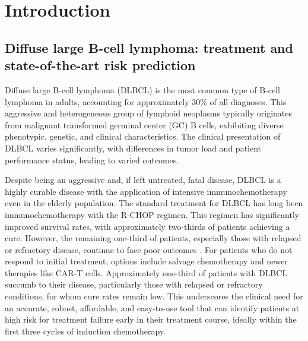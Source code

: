 \chapter{Introduction}

\section{Diffuse large B-cell lymphoma: treatment and state-of-the-art risk prediction}

Diffuse large B-cell lymphoma (DLBCL) is the most common type of B-cell lymphoma in adults, 
accounting for approximately 30\% of all diagnoses. This aggressive and heterogeneous group of 
lymphoid neoplasms typically originates from malignant transformed germinal center (GC) B cells, 
exhibiting diverse phenotypic, genetic, and clinical characteristics. The clinical presentation of 
DLBCL varies significantly, with differences in tumor load and patient performance status, leading 
to varied outcomes.

Despite being an aggressive and, if left untreated, fatal disease, DLBCL is a highly curable disease with the 
application of intensive immunochemotherapy even in the elderly population. The standard treatment 
for DLBCL has long been immunochemotherapy with the R-CHOP regimen. This 
regimen has significantly improved survival rates, with approximately two-thirds of patients 
achieving a cure. However, the remaining one-third of patients, especially 
those with relapsed or refractory disease, continue to face poor outcomes \citep{glass17}. For patients who do not 
respond to initial treatment, options include salvage chemotherapy and newer therapies like CAR-T cells. 
Approximately one-third of patients with DLBCL succumb to their disease, particularly those with 
relapsed or refractory conditions, for whom cure rates remain low. This underscores the clinical 
need for an accurate, robust, affordable, and easy-to-use tool that can identify patients at high risk 
for treatment failure early in their treatment course, ideally within the first three cycles of 
induction chemotherapy. 

